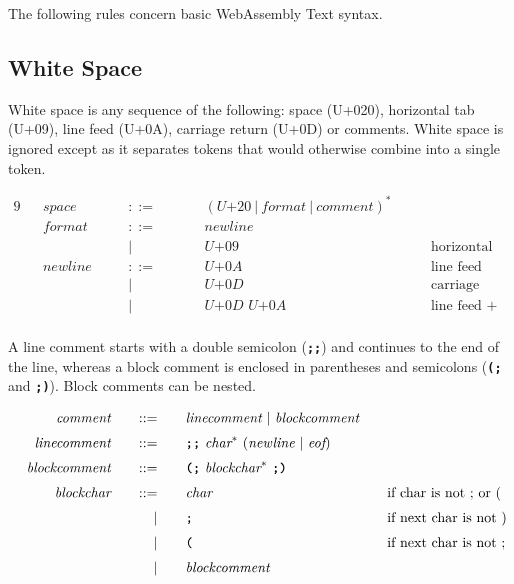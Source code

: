 The following rules concern basic WebAssembly Text syntax.

\subsection{White Space}
White space is any sequence of the following: space (U+020), horizontal tab (U+09), line feed (U+0A), carriage return (U+0D) or comments. White space is ignored except as it separates tokens that would otherwise combine into a single token.

\begin{alignat*}{9}
    && \textit{space}    &&\quad ::= &\quad && (\textit{U+20}\ |\ \textit{format}\ |\ \textit{comment})^*\ \quad && \\[1mm]
    && \textit{format}    &&\quad ::= &\quad && \textit{newline}\  \quad && \\[1mm]
    &&    &&\quad | &\quad && \textit{U+09}  \quad && \textrm{horizontal tab} \\[1mm]
    && \textit{newline}    &&\quad ::= &\quad && \textit{U+0A}\  \quad && \textrm{line feed} \\[1mm]
    &&    &&\quad | &\quad && \textit{U+0D}\ \quad && \textrm{carriage return} \\[1mm]
    &&    &&\quad | &\quad && \textit{U+0D U+0A}\  \quad && \textrm{line feed + carriage return} \\[1mm]
\end{alignat*}

A line comment starts with a double semicolon (\textbf{\texttt{;;}}) and continues to the end of the line, whereas a block comment is enclosed in parentheses and semicolons (\textbf{\texttt{(;}} and \textbf{\texttt{;)}}). Block comments can be nested.

\begin{alignat*}{9}
    && \textit{comment}    &&\quad ::= &\quad && \textit{linecomment}\ |\ \textit{blockcomment}  \quad && \\[1mm]
    && \textit{linecomment}    &&\quad ::= &\quad && \textbf{\texttt{;;}}\ \textit{char}^*\ (\textit{newline}\ |\ \textit{eof})  \quad && \\[1mm]
    && \textit{blockcomment}    &&\quad ::= &\quad && \textbf{\texttt{(;}}\ \textit{blockchar}^*\ \textbf{\texttt{;)}}\  \quad && \\[1mm]
    && \textit{blockchar}&&\quad ::= &\quad && \textit{char} && \textrm{if char is not ; or (} \\[1mm]
    && &&\quad | &\quad && \textrm{\texttt{;}} && \textrm{if next char is not )} \\[1mm]
    && &&\quad | &\quad && \textrm{\texttt{(}} && \textrm{if next char is not ;} \\[1mm]
    && &&\quad | &\quad && \textit{blockcomment} && \\[1mm]
\end{alignat*}

